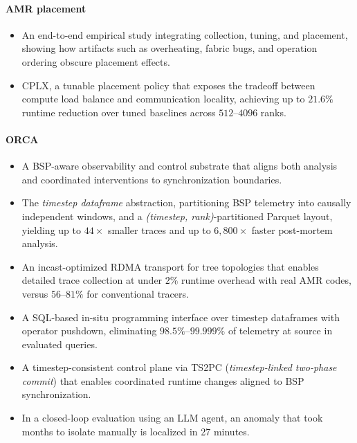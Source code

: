 \paragraph{AMR placement}
\begin{itemize}
  \item An end-to-end empirical study integrating collection, tuning, and placement, showing how
        artifacts such as overheating, fabric bugs, and operation ordering obscure placement effects.

  \item CPLX, a tunable placement policy that exposes the tradeoff between compute load balance and
        communication locality, achieving up to $21.6\%$ runtime reduction over tuned baselines across
        $512$--$4096$ ranks.
\end{itemize}

\paragraph{ORCA}
\begin{itemize}
  \item A BSP-aware observability and control substrate that aligns both analysis and coordinated
        interventions to synchronization boundaries.

  \item The \emph{timestep dataframe} abstraction, partitioning BSP telemetry into causally
        independent windows,
        and a \emph{(timestep, rank)}-partitioned
        Parquet layout, yielding up to $44\times$
        smaller traces and up to $6{,}800\times$ faster post-mortem analysis.

  \item An incast-optimized RDMA transport for tree topologies that enables detailed trace collection
        at under $2\%$ runtime overhead with real AMR codes, versus $56$--$81\%$ for conventional tracers.

  \item A SQL-based in-situ programming interface over timestep dataframes with operator pushdown,
        eliminating $98.5\%$--$99.999\%$ of telemetry
        at source in evaluated queries.

  \item A timestep-consistent control plane via TS2PC (\emph{timestep-linked two-phase commit}) that
        enables coordinated runtime changes aligned to BSP synchronization.

  \item In a closed-loop evaluation using an LLM agent, an anomaly that took months to isolate
        manually is localized in 27 minutes.
\end{itemize}


